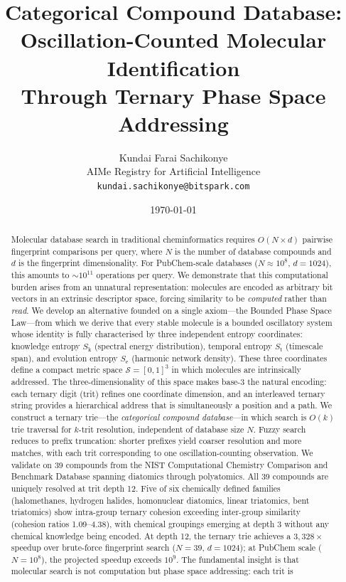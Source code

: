 \documentclass[11pt,twocolumn,a4paper]{article}
\theoremstyle{definition}
\theoremstyle{remark}
\newcommand{\Sk}{S_{\mathrm{k}}}
\newcommand{\St}{S_{\mathrm{t}}}
\newcommand{\Se}{S_{\mathrm{e}}}
\newcommand{\Sspace}{\mathcal{S}}
\begin{document}
\title{\textbf{Categorical Compound Database: \\
Oscillation-Counted Molecular Identification \\
Through Ternary Phase Space Addressing}}

\author{
Kundai Farai Sachikonye\\[0.3em]
AIMe Registry for Artificial Intelligence\\[0.3em]
\texttt{kundai.sachikonye@bitspark.com}
}

\date{\today}

\maketitle

\begin{abstract}
Molecular database search in traditional cheminformatics requires $O(N \times d)$ pairwise fingerprint comparisons per query, where $N$ is the number of database compounds and $d$ is the fingerprint dimensionality. For PubChem-scale databases ($N \approx 10^8$, $d = 1024$), this amounts to $\sim 10^{11}$ operations per query. We demonstrate that this computational burden arises from an unnatural representation: molecules are encoded as arbitrary bit vectors in an extrinsic descriptor space, forcing similarity to be \emph{computed} rather than \emph{read}. We develop an alternative founded on a single axiom---the Bounded Phase Space Law---from which we derive that every stable molecule is a bounded oscillatory system whose identity is fully characterised by three independent entropy coordinates: knowledge entropy $\Sk$ (spectral energy distribution), temporal entropy $\St$ (timescale span), and evolution entropy $\Se$ (harmonic network density). These three coordinates define a compact metric space $\Sspace = [0,1]^3$ in which molecules are intrinsically addressed. The three-dimensionality of this space makes base-3 the natural encoding: each ternary digit (trit) refines one coordinate dimension, and an interleaved ternary string provides a hierarchical address that is simultaneously a position and a path. We construct a ternary trie---the \emph{categorical compound database}---in which search is $O(k)$ trie traversal for $k$-trit resolution, independent of database size $N$. Fuzzy search reduces to prefix truncation: shorter prefixes yield coarser resolution and more matches, with each trit corresponding to one oscillation-counting observation. We validate on 39 compounds from the NIST Computational Chemistry Comparison and Benchmark Database spanning diatomics through polyatomics. All 39 compounds are uniquely resolved at trit depth 12. Five of six chemically defined families (halomethanes, hydrogen halides, homonuclear diatomics, linear triatomics, bent triatomics) show intra-group ternary cohesion exceeding inter-group similarity (cohesion ratios 1.09--4.38), with chemical groupings emerging at depth 3 without any chemical knowledge being encoded. At depth 12, the ternary trie achieves a $3{,}328\times$ speedup over brute-force fingerprint search ($N = 39$, $d = 1024$); at PubChem scale ($N = 10^8$), the projected speedup exceeds $10^9$. The fundamental insight is that molecular search is not computation but phase space addressing: each trit is 
\end{abstract}
\end{document}
